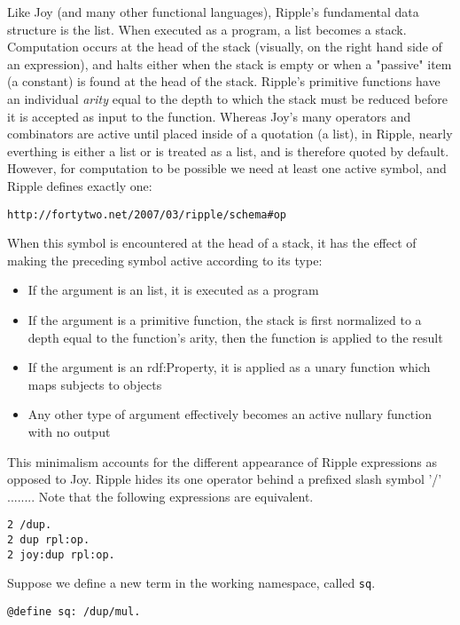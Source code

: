 \documentclass[runningheads]{llncs}
\begin{document}
Like Joy (and many other functional languages), Ripple's fundamental data structure is the list.  When executed as a program, a list becomes a stack.  Computation occurs at the head of the stack (visually, on the right hand side of an expression), and halts either when the stack is empty or when a "passive" item (a constant) is found at the head of the stack.  Ripple's primitive functions have an individual \textit{arity} equal to the depth to which the stack must be reduced before it is accepted as input to the function.  Whereas Joy's many operators and combinators are active until placed inside of a quotation (a list), in Ripple, nearly everthing is either a list or is treated as a list, and is therefore quoted by default.  However, for computation to be possible we need at least one active symbol, and Ripple defines exactly one:

\begin{verbatim}
http://fortytwo.net/2007/03/ripple/schema#op
\end{verbatim}

When this symbol is encountered at the head of a stack, it has the effect of making the preceding symbol active according to its type:
\begin{itemize}
\item If the argument is an list, it is executed as a program
\item If the argument is a primitive function, the stack is first normalized to a depth equal to the function's arity, then the function is applied to the result
\item If the argument is an rdf:Property, it is applied as a unary function which maps subjects to objects
\item Any other type of argument effectively becomes an active nullary function with no output
\end{itemize}

This minimalism accounts for the different appearance of Ripple expressions as opposed to Joy.  Ripple hides its one operator behind a prefixed slash symbol '/'  ........  Note that the following expressions are equivalent.

\begin{verbatim}
2 /dup.
2 dup rpl:op.
2 joy:dup rpl:op.
\end{verbatim}


Suppose we define a new term in the working namespace, called \texttt{sq}.

\begin{verbatim}
@define sq: /dup/mul.
\end{verbatim}
\end{document}

